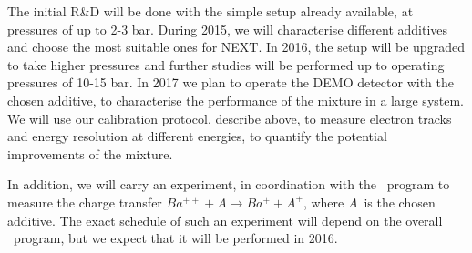\begin{enumerate}
The initial R\&D will be done with the simple setup already available, at pressures of up to 2-3 bar. During 2015, we will characterise different additives and choose the most suitable ones for NEXT. In 2016, the setup will be upgraded to take higher pressures and further studies will be performed up to operating pressures of 10-15 bar. In 2017 we plan to operate the DEMO detector with the chosen additive, to characterise the performance of the mixture in a large system. We will use our calibration protocol, describe above, to measure electron tracks and energy resolution at different energies, to quantify the potential improvements of the mixture. 

In addition, we will carry an experiment, in coordination with the \BATA\ program  to measure the charge transfer $Ba^{++} + A \rightarrow Ba^{+} + A^{+}$, where $A$~is the chosen additive. The exact schedule of such an experiment will depend on the overall \BATA\ program, but we expect that it will be performed in 2016.

\end{enumerate}

